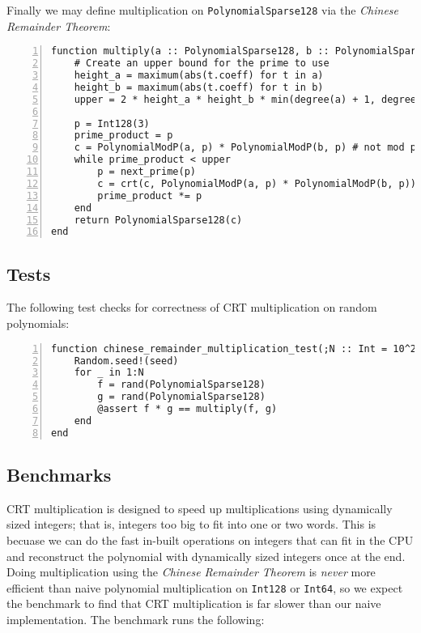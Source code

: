 \documentclass{article}
\theoremstyle{plain}
\numberwithin{theorem}{section}
\numberwithin{example}{section}
\theoremstyle{definition}
\numberwithin{definition}{section}
\begin{document}
Finally we may define multiplication on \texttt{PolynomialSparse128} via the
\emph{Chinese Remainder Theorem}:

\begin{codebox}
    \begin{Verbatim}[numbers=left,xleftmargin=5mm]
function multiply(a :: PolynomialSparse128, b :: PolynomialSparse128)
    # Create an upper bound for the prime to use
    height_a = maximum(abs(t.coeff) for t in a)
    height_b = maximum(abs(t.coeff) for t in b)
    upper = 2 * height_a * height_b * min(degree(a) + 1, degree(b) + 1)

    p = Int128(3)
    prime_product = p
    c = PolynomialModP(a, p) * PolynomialModP(b, p) # not mod prime, but its ok
    while prime_product < upper
        p = next_prime(p)
        c = crt(c, PolynomialModP(a, p) * PolynomialModP(b, p))
        prime_product *= p
    end
    return PolynomialSparse128(c)
end
    \end{Verbatim}
\end{codebox}

\bigbreak

\subsection{Tests}
The following test checks for correctness of CRT multiplication on random
polynomials:

\begin{codebox}
    \begin{Verbatim}[numbers=left,xleftmargin=5mm]
function chinese_remainder_multiplication_test(;N :: Int = 10^2, seed :: Int = 0)
    Random.seed!(seed)
    for _ in 1:N
        f = rand(PolynomialSparse128)
        g = rand(PolynomialSparse128)
        @assert f * g == multiply(f, g)
    end
end
    \end{Verbatim}
\end{codebox}

\bigbreak

\subsection{Benchmarks}
CRT multiplication is designed to speed up multiplications using dynamically
sized integers; that is, integers too big to fit into one or two words. This is
becuase we can do the fast in-built operations on integers that can fit in the
CPU and reconstruct the polynomial with dynamically sized integers once at the
end. Doing multiplication using the \emph{Chinese Remainder Theorem} is
\emph{never} more efficient than naive polynomial multiplication on
\texttt{Int128} or \texttt{Int64}, so we expect the benchmark to find that CRT
multiplication is far slower than our naive implementation. The benchmark runs
the following:
\end{document}
